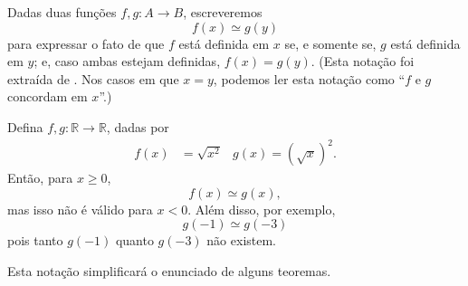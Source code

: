 \begin{notation}
    Dadas duas funções $f, g: A \to B$,
    escreveremos
    \begin{equation*}
        f(x) \simeq g(y)
    \end{equation*}
    para expressar o fato de que
    $f$ está definida em $x$ se, e somente se, $g$ está definida em $y$;
    e, caso ambas estejam definidas,
    $f(x) = g(y)$.
    (Esta notação foi extraída de .
    Nos casos em que $x = y$,
    podemos ler esta notação como ``$f$ e $g$ concordam em $x$''.)
\end{notation}

\begin{example}
    Defina $f, g: \mathbb R \to \mathbb R$, dadas por
    \begin{align*}
        f(x) &= \sqrt{x^2} & g(x) = {(\sqrt x)}^2.
    \end{align*}
    Então, para $x \geq 0$,
    \begin{equation*}
        f(x) \simeq g(x),
    \end{equation*}
    mas isso não é válido para $x < 0$.
    Além disso, por exemplo,
    \begin{equation*}
        g(-1) \simeq g(-3)
    \end{equation*}
    pois tanto $g(-1)$ quanto $g(-3)$ não existem.
\end{example}

Esta notação simplificará o enunciado de alguns teoremas.
